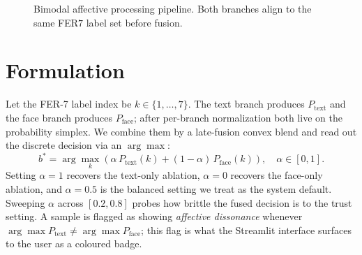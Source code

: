 \documentclass[sigconf,nonacm]{acmart}
\begin{document}
\begin{figure}[t]
\centering
{}
\caption{Bimodal affective processing pipeline. Both branches align to the same FER\texorpdfstring{$7$}{\,7} label set before fusion.}
\label{fig:pipeline}
\end{figure}

\section{Formulation}
Let the FER-7 label index be $k\in\{1,\ldots,7\}$. The text branch produces $P_\text{text}$ and the face branch produces $P_\text{face}$; after per-branch normalization both live on the probability simplex. We combine them by a late-fusion convex blend and read out the discrete decision via an $\arg\max$:
\begin{equation}
  b^* = \arg\max_{k} \left( \alpha\, P_\text{text}(k) + (1-\alpha)\, P_\text{face}(k) \right), \quad \alpha\in[0,1].
  \label{eq:main}
\end{equation}
Setting $\alpha\!=\!1$ recovers the text-only ablation, $\alpha\!=\!0$ recovers the face-only ablation, and $\alpha\!=\!0.5$ is the balanced setting we treat as the system default. Sweeping $\alpha$ across $[0.2,0.8]$ probes how brittle the fused decision is to the trust setting. A sample is flagged as showing \emph{affective dissonance} whenever $\arg\max P_\text{text}\neq\arg\max P_\text{face}$; this flag is what the Streamlit interface surfaces to the user as a coloured badge.
\end{document}
